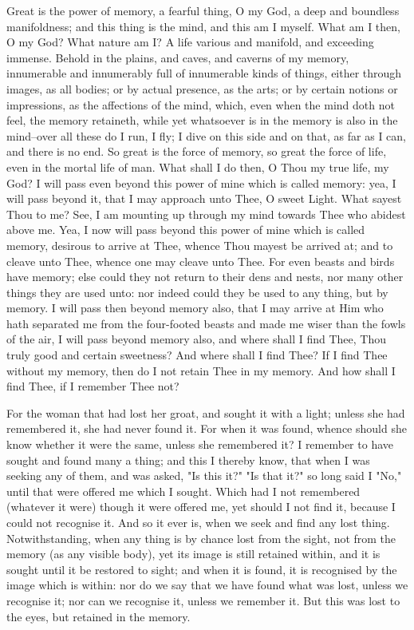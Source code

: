 \documentclass[b5paper,openright,12pt,twoside]{book}
\begin{document}
Great is the power of memory, a fearful thing, O my God, a deep and
boundless manifoldness; and this thing is the mind, and this am I
myself. What am I then, O my God? What nature am I? A life various and
manifold, and exceeding immense. Behold in the plains, and caves, and
caverns of my memory, innumerable and innumerably full of innumerable
kinds of things, either through images, as all bodies; or by actual
presence, as the arts; or by certain notions or impressions, as the
affections of the mind, which, even when the mind doth not feel, the
memory retaineth, while yet whatsoever is in the memory is also in the
mind--over all these do I run, I fly; I dive on this side and on that,
as far as I can, and there is no end. So great is the force of memory,
so great the force of life, even in the mortal life of man. What shall I
do then, O Thou my true life, my God? I will pass even beyond this power
of mine which is called memory: yea, I will pass beyond it, that I may
approach unto Thee, O sweet Light. What sayest Thou to me? See, I am
mounting up through my mind towards Thee who abidest above me. Yea, I
now will pass beyond this power of mine which is called memory, desirous
to arrive at Thee, whence Thou mayest be arrived at; and to cleave unto
Thee, whence one may cleave unto Thee. For even beasts and birds have
memory; else could they not return to their dens and nests, nor many
other things they are used unto: nor indeed could they be used to any
thing, but by memory. I will pass then beyond memory also, that I may
arrive at Him who hath separated me from the four-footed beasts and made
me wiser than the fowls of the air, I will pass beyond memory also,
and where shall I find Thee, Thou truly good and certain sweetness? And
where shall I find Thee? If I find Thee without my memory, then do I not
retain Thee in my memory. And how shall I find Thee, if I remember Thee
not?

For the woman that had lost her groat, and sought it with a light;
unless she had remembered it, she had never found it. For when it was
found, whence should she know whether it were the same, unless she
remembered it? I remember to have sought and found many a thing; and
this I thereby know, that when I was seeking any of them, and was asked,
"Is this it?" "Is that it?" so long said I "No," until that were offered
me which I sought. Which had I not remembered (whatever it were) though
it were offered me, yet should I not find it, because I could not
recognise it. And so it ever is, when we seek and find any lost thing.
Notwithstanding, when any thing is by chance lost from the sight, not
from the memory (as any visible body), yet its image is still retained
within, and it is sought until it be restored to sight; and when it is
found, it is recognised by the image which is within: nor do we say
that we have found what was lost, unless we recognise it; nor can we
recognise it, unless we remember it. But this was lost to the eyes, but
retained in the memory.
\end{document}
